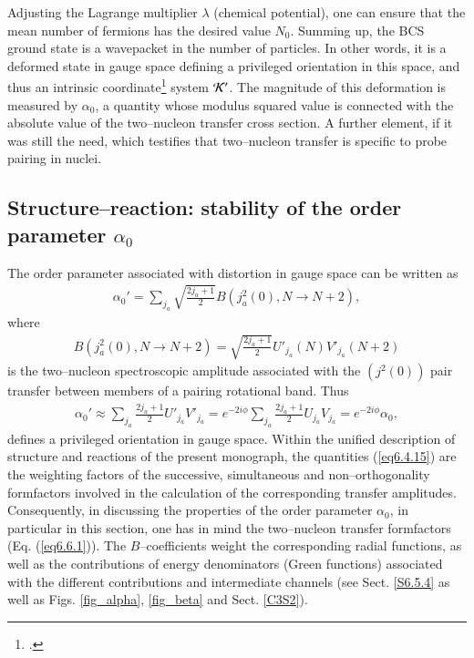 Adjusting the Lagrange multiplier $\lambda$ (chemical potential), one can ensure that the mean number of fermions has the desired value $N_0$.
Summing up, the BCS ground state is a wavepacket in the number of particles. In other words, it is a deformed state in gauge space  defining a privileged 
orientation in this space, and thus an intrinsic coordinate\footnote{\cite{Anderson:58, Bohr:64,Bes:66}.} system ${\cal K'}$.
The magnitude of this deformation is measured by $\alpha_0$, a quantity whose modulus squared value is connected with the absolute value of the two--nucleon transfer cross section. A further element, if it was still the need, which testifies that two--nucleon transfer is specific to probe pairing in nuclei.
\subsection{Structure--reaction: stability of the order parameter $\alpha_0$}\label{C6S2.3}
The order parameter associated with distortion in gauge space can be written as 
\begin{align}
\alpha_0'=\sum_{j_a}\sqrt{\frac{2j_a+1}{2}}B(j^2_a(0),N\to N+2),
\end{align}
where
\begin{align}\label{eq6.4.15x}
B(j^2_a(0),N\to N+2)=\sqrt{\frac{2j_a+1}{2}}U'_{j_a}(N)V'_{j_a}(N+2)
\end{align}
is the two--nucleon spectroscopic amplitude associated with the $(j^2(0))$ pair transfer between members of a pairing rotational band. Thus 
\begin{align}\label{eq6.4.15}
\alpha_0'\approx\sum_{j_a}\frac{2j_a+1}{2}U'_{j_a}V'_{j_a}=e^{-2i\phi}\sum_{j_a}\frac{2j_a+1}{2}U_{j_a}V_{j_a}=e^{-2i\phi}\alpha_0,
\end{align}
defines a privileged orientation in gauge space. Within the unified description of structure and reactions of the present monograph, the quantities (\ref{eq6.4.15}) are the weighting factors of the successive, simultaneous and non--orthogonality formfactors involved in the calculation of the corresponding transfer amplitudes. Consequently, in discussing the properties of the order parameter $\alpha_0$, in particular in this section, one has in mind the two--nucleon transfer formfactors (Eq. (\ref{eq6.6.1})).  The $B$--coefficients weight the corresponding radial functions, as well as the contributions of energy denominators (Green functions) associated with the different contributions and intermediate channels (see Sect. \ref{S6.5.4} as well as Figs. \ref{fig_alpha}, \ref{fig_beta} and Sect. \ref{C3S2}).


